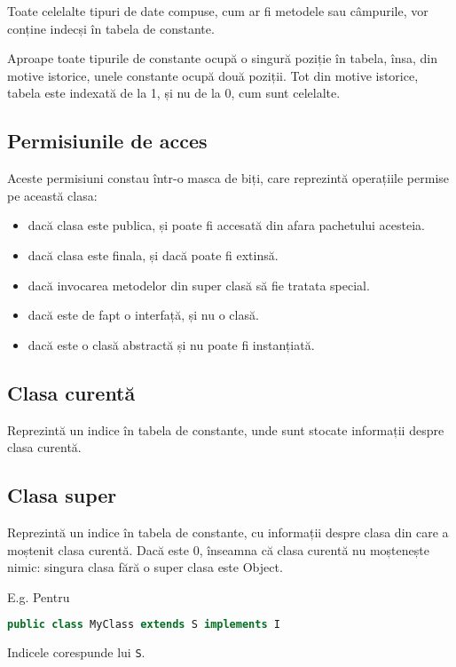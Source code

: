 Toate celelalte tipuri de date compuse, cum ar fi metodele sau
câmpurile, vor conține indecși în tabela de constante.

Aproape toate tipurile de constante ocupă o singură poziție în tabela, însa, din
motive istorice, unele constante ocupă două poziții.
Tot din motive istorice, tabela este indexată de la 1, și nu
de la 0, cum sunt celelalte.

\subsection{Permisiunile de acces}

Aceste permisiuni constau într-o masca de biți, care reprezintă
operațiile permise pe această clasa:

\begin{itemize}
	\item dacă clasa este publica, și poate fi accesată din afara pachetului acesteia.
	\item dacă clasa este finala, și dacă poate fi extinsă.
	\item dacă invocarea metodelor din super clasă să fie tratata special.
	\item dacă este de fapt o interfață, și nu o clasă.
	\item dacă este o clasă abstractă și nu poate fi instanțiată.
\end{itemize}

\subsection{Clasa curentă}

Reprezintă un indice în tabela de constante, unde sunt stocate
informații despre clasa curentă.

\subsection{Clasa super}

Reprezintă un indice în tabela de constante, cu informații despre clasa
din care a moștenit clasa curentă. Dacă este 0, înseamna că clasa
curentă nu moștenește nimic: singura clasa fără o super clasa este
Object.

E.g. Pentru

\begin{lstlisting}[language=Java]
public class MyClass extends S implements I
\end{lstlisting}

Indicele corespunde lui \texttt{S}.

